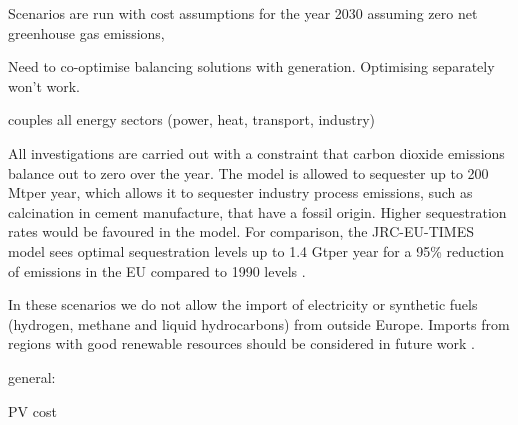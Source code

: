 Scenarios are run with cost
assumptions for the year 2030 assuming zero net greenhouse gas emissions,

Need to co-optimise balancing solutions with generation. Optimising separately won't work.

couples all energy sectors (power, heat, transport, industry)


All investigations are carried out with a constraint that carbon dioxide
emissions balance out to zero over the year. The model is allowed to sequester
up to 200 Mt\co per year, which allows it to sequester industry process
emissions, such as calcination in cement manufacture, that have a fossil origin.
Higher sequestration rates would be favoured in the model. For comparison, the
JRC-EU-TIMES model sees optimal sequestration levels up to 1.4 Gt\co per year
for a 95\% reduction of \co emissions in the EU compared to 1990 levels
\cite{blancoPotentialHydrogen2018}.

In these scenarios we do not allow the import of electricity or synthetic fuels
(hydrogen, methane and liquid hydrocarbons) from outside Europe. Imports from
regions with good renewable resources should be considered in future work
\cite{fasihiTechnoeconomicAssessment2019,heuserTechnoeconomicAnalysis2019}.

general:
\cite{
    mckennaScenicnessAssessment2021,
    krummModellingSocial2022,
    weinandImpactPublic2021,
    weinandExploringTrilemma,
    trondleTradeOffsGeographic2020,
    sasseDistributionalTradeoffs2019,
    sasseRegionalImpacts2020,
    ludererImpactDeclining2021,
    EuropeanHydrogen,
    victoria2020,
    victoriaSpeedTechnological2021,
    lombardiPolicyDecision2020,
    tsiropoulosNetzeroEmissions2020,
    europeancommission.directorategeneralforenergy.METISStudy2021,
    deutschNoRegretHydrogen,
    tafarteQuantifyingTrade,
    lehmannManagingSpatial}

PV cost
\cite{
    jaxa-rozenSourcesUncertainty2021,
    victoriaSolarPhotovoltaics2021,
    xiaoPlummetingCosts2021}
